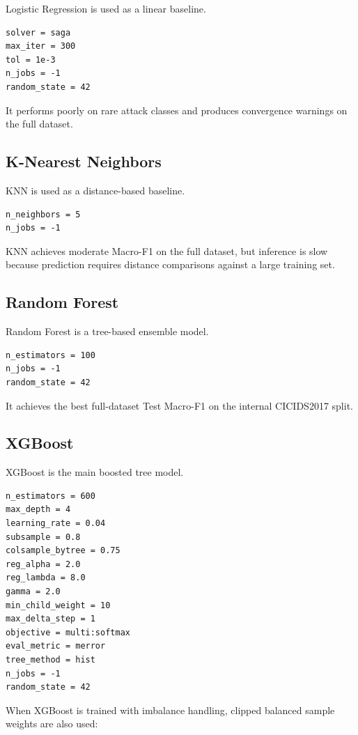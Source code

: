 \documentclass[12pt,a4paper]{article}
\begin{document}
Logistic Regression is used as a linear baseline.

\begin{lstlisting}
solver = saga
max_iter = 300
tol = 1e-3
n_jobs = -1
random_state = 42
\end{lstlisting}

It performs poorly on rare attack classes and produces convergence warnings on the full dataset.

\subsection{K-Nearest Neighbors}

KNN is used as a distance-based baseline.

\begin{lstlisting}
n_neighbors = 5
n_jobs = -1
\end{lstlisting}

KNN achieves moderate Macro-F1 on the full dataset, but inference is slow because prediction requires distance comparisons against a large training set.

\subsection{Random Forest}

Random Forest is a tree-based ensemble model.

\begin{lstlisting}
n_estimators = 100
n_jobs = -1
random_state = 42
\end{lstlisting}

It achieves the best full-dataset Test Macro-F1 on the internal CICIDS2017 split.

\subsection{XGBoost}

XGBoost is the main boosted tree model.

\begin{lstlisting}
n_estimators = 600
max_depth = 4
learning_rate = 0.04
subsample = 0.8
colsample_bytree = 0.75
reg_alpha = 2.0
reg_lambda = 8.0
gamma = 2.0
min_child_weight = 10
max_delta_step = 1
objective = multi:softmax
eval_metric = merror
tree_method = hist
n_jobs = -1
random_state = 42
\end{lstlisting}

When XGBoost is trained with imbalance handling, clipped balanced sample weights are also used:
\end{document}
